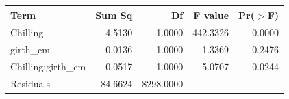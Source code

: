 \begin{table}[ht]
\centering
\begin{tabular}{lrrrr}
  \hline
Term & Sum Sq & Df & F value & Pr($>$F) \\ 
  \hline
Chilling & 4.5130 & 1.0000 & 442.3326 & 0.0000 \\ 
  girth\_cm & 0.0136 & 1.0000 & 1.3369 & 0.2476 \\ 
  Chilling:girth\_cm & 0.0517 & 1.0000 & 5.0707 & 0.0244 \\ 
  Residuals & 84.6624 & 8298.0000 &  &  \\ 
   \hline
\end{tabular}
\end{table}
